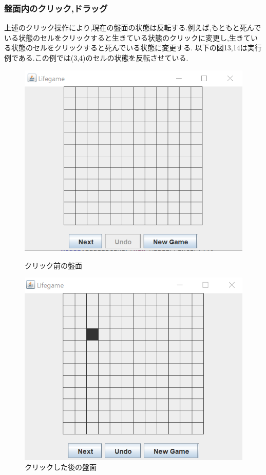 \documentclass[dvipdfmx]{jarticle}
\begin{document}
\subsubsection{盤面内のクリック,ドラッグ}
上述のクリック操作により,現在の盤面の状態は反転する.例えば,もともと死んでいる状態のセルをクリックすると生きている状態のクリックに変更し,生きている状態のセルをクリックすると死んでいる状態に変更する.
以下の図13,14は実行例である.この例では(3,4)のセルの状態を反転させている.
\begin{figure}[htbp]
    \begin{minipage}[b]{0.45\linewidth}
      \centering
      \includegraphics[keepaspectratio, scale=0.4]{panel_normal.png}
      \caption{クリック前の盤面}
    \end{minipage}
    \begin{minipage}[b]{0.45\linewidth}
      \centering
      \includegraphics[keepaspectratio, scale=0.4]{panel_click.png}
      \caption{クリックした後の盤面}
    \end{minipage}
  \end{figure}
\end{document}
